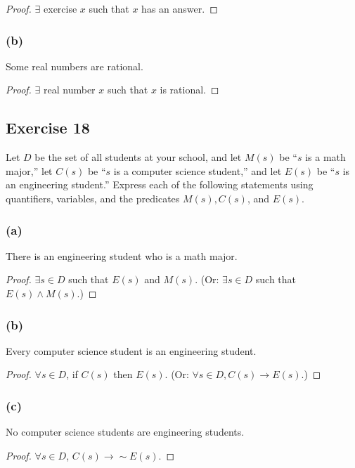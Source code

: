 \documentclass[14pt]{extarticle}
\newcommand{\fa}{\forall}
\newcommand{\te}{\exists}
\begin{document}
\begin{proof}
$\te$ exercise $x$ such that $x$ has an answer.
\end{proof}

\subsubsection{(b)}
Some real numbers are rational.

\begin{proof}
$\te$ real number $x$ such that $x$ is rational.
\end{proof}

\subsection{Exercise 18}
Let $D$ be the set of all students at your school, and let $M(s)$ be “$s$ is a math major,” let $C(s)$ be “$s$ is a computer science student,” and let $E(s)$ be “$s$ is an engineering student.” Express each of the following statements using quantifiers, variables, and the predicates $M(s), C(s)$, and $E(s)$.

\subsubsection{(a)}
There is an engineering student who is a math major.

\begin{proof}
$\te s \in D$ such that $E(s)$ and $M(s)$. (Or: $\te s \in D$ such that $E(s) \wedge M(s)$.)
\end{proof}

\subsubsection{(b)}
Every computer science student is an engineering student.

\begin{proof}
$\fa s \in D$, if $C(s)$ then $E(s)$. (Or: $\fa s \in D, C(s) \to E(s)$.)
\end{proof}

\subsubsection{(c)}
No computer science students are engineering students.

\begin{proof}
$\fa s \in D$, $C(s) \to \sim E(s)$.
\end{proof}
\end{document}
